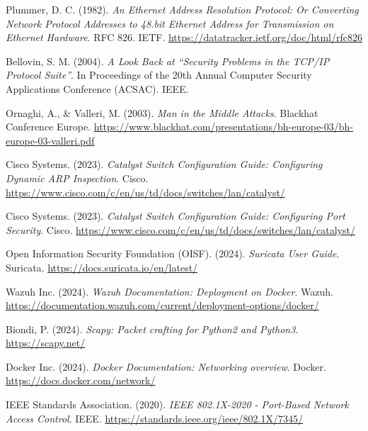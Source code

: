 \documentclass[12pt, a4paper]{article}
\begin{document}
\begin{enumerate}[leftmargin=2cm, label={[\arabic*]}]
    \item Plummer, D. C. (1982). \textit{An Ethernet Address Resolution Protocol: Or Converting Network Protocol Addresses to 48.bit Ethernet Address for Transmission on Ethernet Hardware}. RFC 826. IETF. \url{https://datatracker.ietf.org/doc/html/rfc826}

    \item Bellovin, S. M. (2004). \textit{A Look Back at ``Security Problems in the TCP/IP Protocol Suite''}. In Proceedings of the 20th Annual Computer Security Applications Conference (ACSAC). IEEE.

    \item Ornaghi, A., \& Valleri, M. (2003). \textit{Man in the Middle Attacks}. Blackhat Conference Europe. \url{https://www.blackhat.com/presentations/bh-europe-03/bh-europe-03-valleri.pdf}

    \item Cisco Systems. (2023). \textit{Catalyst Switch Configuration Guide: Configuring Dynamic ARP Inspection}. Cisco. \url{https://www.cisco.com/c/en/us/td/docs/switches/lan/catalyst/}

    \item Cisco Systems. (2023). \textit{Catalyst Switch Configuration Guide: Configuring Port Security}. Cisco. \url{https://www.cisco.com/c/en/us/td/docs/switches/lan/catalyst/}

    \item Open Information Security Foundation (OISF). (2024). \textit{Suricata User Guide}. Suricata. \url{https://docs.suricata.io/en/latest/}

    \item Wazuh Inc. (2024). \textit{Wazuh Documentation: Deployment on Docker}. Wazuh. \url{https://documentation.wazuh.com/current/deployment-options/docker/}

    \item Biondi, P. (2024). \textit{Scapy: Packet crafting for Python2 and Python3}. \url{https://scapy.net/}

    \item Docker Inc. (2024). \textit{Docker Documentation: Networking overview}. Docker. \url{https://docs.docker.com/network/}

    \item IEEE Standards Association. (2020). \textit{IEEE 802.1X-2020 - Port-Based Network Access Control}. IEEE. \url{https://standards.ieee.org/ieee/802.1X/7345/}


\end{enumerate}
\end{document}
